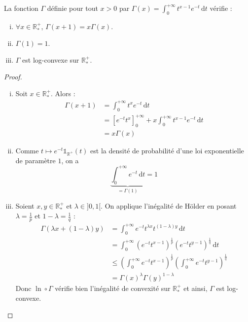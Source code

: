 






	\begin{lemma}
		\label{caracterisation-reelle-de-gamma-1}
		La fonction $\Gamma$ définie pour tout $x > 0$ par $\Gamma(x) = \int_0^{+\infty} t^{x-1} e^{-t} \, \mathrm{d}t$ vérifie :
		\begin{enumerate}[(i)]
			\item $\forall x \in \mathbb{R}^+_*$, $\Gamma(x+1) = x\Gamma(x)$.
			\item $\Gamma(1) = 1$.
			\item $\Gamma$ est log-convexe sur $\mathbb{R}^+_*$.
		\end{enumerate}
	\end{lemma}

	\begin{proof}
		\begin{enumerate}[(i)]
			\item Soit $x \in \mathbb{R}^+_*$. Alors :
			\begin{align*}
				\Gamma(x+1) &= \int_0^{+\infty} t^x e^{-t} \, \mathrm{d}t \\
				&= \left[ e^{-t} t^x \right]_0^{+\infty} + x \int_0^{+\infty} t^{x-1} e^{-t} \, \mathrm{d}t \\
				&= x\Gamma(x)
			\end{align*}
			\item Comme $t \mapsto e^{-t} \mathbb{1}_{\mathbb{R}^+}(t)$ est la densité de probabilité d'une loi exponentielle de paramètre $1$, on a
			\[ \underbrace{\int_0^{+\infty} e^{-t} \, \mathrm{d}t}_{= \Gamma(1)} = 1 \]
			\item Soient $x, y \in \mathbb{R}^+_*$ et $\lambda \in ]0, 1[$. On applique l'inégalité de Hölder en posant $\lambda = \frac{1}{p}$ et $1-\lambda = \frac{1}{q}$ :
			\begin{align*}
				\Gamma(\lambda x + (1-\lambda) y) &= \int_0^{+\infty} e^{-t} t^{\lambda x} t^{(1-\lambda)y} \, \mathrm{d}t \\
				&= \int_0^{+\infty} (e^{-t} t^{x-1})^{\frac{1}{p}} (e^{-t} t^{y-1})^{\frac{1}{q}} \, \mathrm{d}t \\
				&\leq \left (\int_0^{+\infty} e^{-t} t^{x-1} \right)^{\frac{1}{p}} \left (\int_0^{+\infty} e^{-t} t^{y-1} \right)^{\frac{1}{q}} \\
				&= \Gamma(x)^\lambda \Gamma(y)^{1-\lambda}
			\end{align*}
			Donc $\ln \circ \Gamma$ vérifie bien l'inégalité de convexité sur $\mathbb{R}^+_*$ et ainsi, $\Gamma$ est log-convexe.
		\end{enumerate}
	\end{proof}

